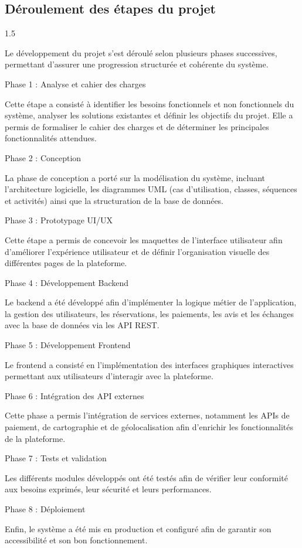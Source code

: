 \documentclass[a4paper,12pt]{report}
\begin{document}
\subsection{Déroulement des étapes du projet}
\vspace{0.5cm}
\begin{spacing}{1.5}
\justifying




Le développement du projet s'est déroulé selon plusieurs phases successives, permettant d'assurer une progression structurée et cohérente du système.

Phase 1 : Analyse et cahier des charges

Cette étape a consisté à identifier les besoins fonctionnels et non fonctionnels du système, analyser les solutions existantes et définir les objectifs du projet. Elle a permis de formaliser le cahier des charges et de déterminer les principales fonctionnalités attendues.

Phase 2 : Conception

La phase de conception a porté sur la modélisation du système, incluant l'architecture logicielle, les diagrammes UML (cas d'utilisation, classes, séquences et activités) ainsi que la structuration de la base de données.

Phase 3 : Prototypage UI/UX

Cette étape a permis de concevoir les maquettes de l'interface utilisateur afin d'améliorer l'expérience utilisateur et de définir l'organisation visuelle des différentes pages de la plateforme.

Phase 4 : Développement Backend

Le backend a été développé afin d'implémenter la logique métier de l'application, la gestion des utilisateurs, les réservations, les paiements, les avis et les échanges avec la base de données via les API REST.

Phase 5 : Développement Frontend

Le frontend a consisté en l'implémentation des interfaces graphiques interactives permettant aux utilisateurs d'interagir avec la plateforme.

Phase 6 : Intégration des API externes

Cette phase a permis l'intégration de services externes, notamment les APIs de paiement, de cartographie et de géolocalisation afin d'enrichir les fonctionnalités de la plateforme.

Phase 7 : Tests et validation

Les différents modules développés ont été testés afin de vérifier leur conformité aux besoins exprimés, leur sécurité et leurs performances.

Phase 8 : Déploiement

Enfin, le système a été mis en production et configuré afin de garantir son accessibilité et son bon fonctionnement.
\end{spacing}
\end{document}
